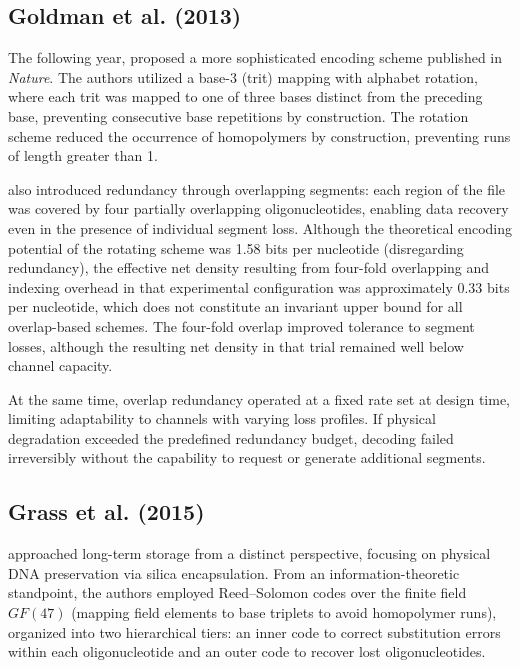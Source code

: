 \subsection{Goldman et al. (2013)}

The following year,  proposed a more sophisticated encoding scheme published in \emph{Nature}. The authors utilized a base-3 (trit) mapping with alphabet rotation, where each trit was mapped to one of three bases distinct from the preceding base, preventing consecutive base repetitions by construction. The rotation scheme reduced the occurrence of homopolymers by construction, preventing runs of length greater than 1.

 also introduced redundancy through overlapping segments: each region of the file was covered by four partially overlapping oligonucleotides, enabling data recovery even in the presence of individual segment loss. Although the theoretical encoding potential of the rotating scheme was 1.58 bits per nucleotide (disregarding redundancy), the effective net density resulting from four-fold overlapping and indexing overhead in that experimental configuration was approximately $0.33$ bits per nucleotide, which does not constitute an invariant upper bound for all overlap-based schemes. The four-fold overlap improved tolerance to segment losses, although the resulting net density in that trial remained well below channel capacity.

At the same time, overlap redundancy operated at a fixed rate set at design time, limiting adaptability to channels with varying loss profiles. If physical degradation exceeded the predefined redundancy budget, decoding failed irreversibly without the capability to request or generate additional segments.

\subsection{Grass et al. (2015)}

 approached long-term storage from a distinct perspective, focusing on physical DNA preservation via silica encapsulation. From an information-theoretic standpoint, the authors employed Reed--Solomon codes over the finite field $GF(47)$ (mapping field elements to base triplets to avoid homopolymer runs), organized into two hierarchical tiers: an inner code to correct substitution errors within each oligonucleotide and an outer code to recover lost oligonucleotides.

